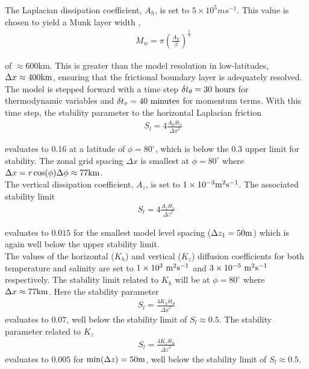The Laplacian dissipation coefficient, $A_{h}$, is set to $5 \times 10^5 m s^{-1}$.
This value is chosen to yield a Munk layer width \cite{adcroft:95},
\begin{eqnarray}
\label{EQ:eg-global-munk_layer}
&& M_{w} = \pi ( \frac { A_{h} }{ \beta } )^{\frac{1}{3}}
\end{eqnarray}

\noindent  of $\approx 600$km. This is greater than the model
resolution in low-latitudes, $\Delta x \approx 400{\rm km}$, ensuring that the frictional 
boundary layer is adequately resolved.
\\

\noindent The model is stepped forward with a 
time step $\delta t_{\theta}=30~{\rm hours}$ for thermodynamic variables and
$\delta t_{v}=40~{\rm minutes}$ for momentum terms. With this time step, the stability 
parameter to the horizontal Laplacian friction \cite{adcroft:95}
\begin{eqnarray}
\label{EQ:eg-global-laplacian_stability}
&& S_{l} = 4 \frac{A_{h} \delta t_{v}}{{\Delta x}^2}
\end{eqnarray}

\noindent evaluates to 0.16 at a latitude of $\phi=80^{\circ}$, which is below the 
0.3 upper limit for stability. The zonal grid spacing $\Delta x$ is smallest at
$\phi=80^{\circ}$ where $\Delta x=r\cos(\phi)\Delta \phi\approx 77{\rm km}$.
\\

\noindent The vertical dissipation coefficient, $A_{z}$, is set to 
$1\times10^{-3} {\rm m}^2{\rm s}^{-1}$. The associated stability limit
\begin{eqnarray}
\label{EQ:eg-global-laplacian_stability_z}
S_{l} = 4 \frac{A_{z} \delta t_{v}}{{\Delta z}^2}
\end{eqnarray}

\noindent evaluates to $0.015$ for the smallest model
level spacing ($\Delta z_{1}=50{\rm m}$) which is again well below
the upper stability limit.
\\

The values of the horizontal ($K_{h}$) and vertical ($K_{z}$) diffusion coefficients 
for both temperature and salinity are set to $1 \times 10^{3}~{\rm m}^{2}{\rm s}^{-1}$ 
and $3 \times 10^{-5}~{\rm m}^{2}{\rm s}^{-1}$ respectively. The stability limit 
related to $K_{h}$ will be at $\phi=80^{\circ}$ where $\Delta x \approx 77 {\rm km}$. 
Here the stability parameter 
\begin{eqnarray} 
\label{EQ:eg-global-laplacian_stability_xtheta}
S_{l} = \frac{4 K_{h} \delta t_{\theta}}{{\Delta x}^2} 
\end{eqnarray}
evaluates to $0.07$, well below the stability limit of $S_{l} \approx 0.5$. The 
stability parameter related to $K_{z}$
\begin{eqnarray} 
\label{EQ:eg-global-laplacian_stability_ztheta}
S_{l} = \frac{4 K_{z} \delta t_{\theta}}{{\Delta z}^2} 
\end{eqnarray}
evaluates to $0.005$ for $\min(\Delta z)=50{\rm m}$, well below the stability limit 
of $S_{l} \approx 0.5$.
\\

